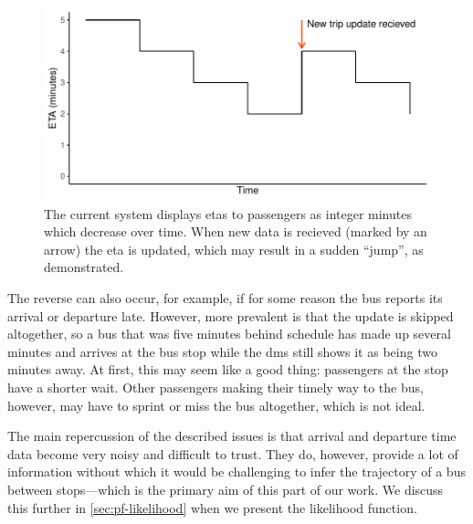 \begin{knitrout}\small
{}\color{fgcolor}\begin{figure}

{\centering \includegraphics[width=.8\textwidth]{figure/tu_eta_jump-1} 

}

\caption[ETAs as percieved by passengers under the current system]{The current system displays \glspl{eta} to passengers as integer minutes which decrease over time. When new data is recieved (marked by an arrow) the \gls{eta} is updated, which may result in a sudden ``jump'', as demonstrated.}\label{fig:tu_eta_jump}
\end{figure}


\end{knitrout}


The reverse can also occur, for example, if for some reason the bus reports its arrival or departure late. However, more prevalent is that the update is skipped altogether, so a bus that was five minutes behind schedule has made up several minutes and arrives at the bus stop while the \gls{dms} still shows it as being two minutes away. At first, this may seem like a good thing: passengers at the stop have a shorter wait. Other passengers making their timely way to the bus, however, may have to sprint or miss the bus altogether, which is not ideal.


The main repercussion of the described issues is that arrival and departure time data become very noisy and difficult to trust. They do, however, provide a lot of information without which it would be challenging to infer the trajectory of a bus between stops---which is the primary aim of this part of our work. We discuss this further in \cref{sec:pf-likelihood} when we present the likelihood function.
